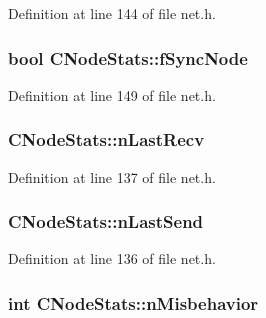 Definition at line 144 of file net.\+h.

\hypertarget{class_c_node_stats_a82d6fca82ac649d6ba746a18faec6d79}{}
\subsubsection[{f\+Sync\+Node}]{\setlength{\rightskip}{0pt plus 5cm}bool C\+Node\+Stats\+::f\+Sync\+Node}\label{class_c_node_stats_a82d6fca82ac649d6ba746a18faec6d79}


Definition at line 149 of file net.\+h.

\hypertarget{class_c_node_stats_a67b3cd5817ad20bfb2d9eb1583f1deb5}{}
\subsubsection[{n\+Last\+Recv}]{ C\+Node\+Stats\+::n\+Last\+Recv}\label{class_c_node_stats_a67b3cd5817ad20bfb2d9eb1583f1deb5}


Definition at line 137 of file net.\+h.

\hypertarget{class_c_node_stats_adc88b64389f26227db58ed86058d2e1a}{}
\subsubsection[{n\+Last\+Send}]{ C\+Node\+Stats\+::n\+Last\+Send}\label{class_c_node_stats_adc88b64389f26227db58ed86058d2e1a}


Definition at line 136 of file net.\+h.

\hypertarget{class_c_node_stats_ae5c21d0bb707eff8e43174078c1a1a00}{}
\subsubsection[{n\+Misbehavior}]{\setlength{\rightskip}{0pt plus 5cm}int C\+Node\+Stats\+::n\+Misbehavior}\label{class_c_node_stats_ae5c21d0bb707eff8e43174078c1a1a00}


